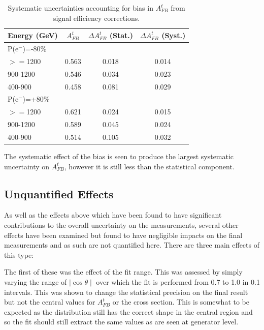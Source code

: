 \begin{table}
  \centering
  \begin{tabular}{l|c|c|c}
    \toprule
    Energy (GeV)& $A_{FB}^t$ & $\Delta A_{FB}^t$  (Stat.) & $\Delta A^t_{FB}$ (Syst.)  \\
    \midrule
    \midrule
    \multicolumn{4}{l}{P(e$^-$)=-80\%} \\
    \midrule
    \midrule
    $>=$1200   & 0.563 & 0.018 & 0.014\\
    \midrule
    900-1200   & 0.546 & 0.034 & 0.023\\
    \midrule
    400-900    & 0.458 & 0.081 & 0.029\\
    \midrule
    \midrule
    \multicolumn{4}{l}{ P(e$^-$)=+80\%}\\
    \midrule
    \midrule
    $>=$1200  & 0.621 & 0.024 & 0.015\\
    \midrule
    900-1200  & 0.589 & 0.045 & 0.024\\
    \midrule
    400-900   & 0.514 & 0.105 & 0.032\\
    \bottomrule
  \end{tabular}
  \caption{Systematic uncertainties accounting for bias in $A_{FB}^t$ from signal efficiency corrections.}
  \label{tab:biassys}
\end{table}

The systematic effect of the bias is seen to produce the largest systematic uncertainty on $A_{FB}^t$, however it is still less than the statistical component.

\subsection{Unquantified Effects}

As well as the effects above which have been found to have significant contributions to the overall uncertainty on the measurements, several other effects have been examined but found to have negligible impacts on the final measurements and as such are not quantified here. There are three main effects of this type:

The first of these was the effect of the fit range. This was assessed by simply varying the range of $\mid\cos\theta\mid$ over which the fit is performed from 0.7 to 1.0 in 0.1 intervals. This was shown to change the statistical precision on the final result but not the central values for $A_{FB}^t$ or the cross section. This is somewhat to be expected as the distribution still has the correct shape in the central region and so the fit should still extract the same values as are seen at generator level.

